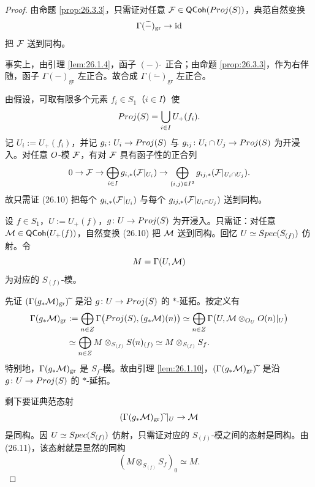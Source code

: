 \begin{proof}
由命题 \ref{prop:26.3.3}，只需证对任意 $\mathcal{F} \in \mathsf{QCoh}(Proj(S))$，典范自然变换
\begin{equation}\label{eq:26.10}
\Gamma(\widetilde{-})_{\mathrm{gr}} \to \operatorname{id}
\end{equation}
把 $\mathcal{F}$ 送到同构。

事实上，由引理 \ref{lem:26.1.4}，函子 $(-)\widetilde{\ }$ 正合；由命题 \ref{prop:26.3.3}，作为右伴随，函子 $\Gamma(-)_{\mathrm{gr}}$ 左正合。故合成 $\Gamma(\widetilde{-})_{\mathrm{gr}}$ 左正合。

由假设，可取有限多个元素 $f_i \in S_1$（$i \in I$）使
\[
Proj(S) = \bigcup_{i \in I} U_+(f_i).
\]
记 $U_i := U_+(f_i)$，并记 $g_i \colon U_i \to Proj(S)$ 与 $g_{ij} \colon U_i \cap U_j \to Proj(S)$ 为开浸入。对任意 $O$-模 $\mathcal{F}$，有对 $\mathcal{F}$ 具有函子性的正合列
\[
0 \to \mathcal{F} \to \bigoplus_{i \in I} g_{i,*}(\mathcal{F}|_{U_i}) \to \bigoplus_{(i,j) \in I^2} g_{ij,*}(\mathcal{F}|_{U_i \cap U_j}).
\]
故只需证 (26.10) 把每个 $g_{i,*}(\mathcal{F}|_{U_i})$ 与每个 $g_{ij,*}(\mathcal{F}|_{U_i \cap U_j})$ 送到同构。

设 $f \in S_1$，$U := U_+(f)$，$g \colon U \to Proj(S)$ 为开浸入。只需证：对任意 $\mathcal{M} \in \mathsf{QCoh}(U_+(f))$，自然变换 (26.10) 把 $\mathcal{M}$ 送到同构。回忆 $U \simeq Spec(S_{(f)})$ 仿射。令
\[
M = \Gamma(U, \mathcal{M})
\]
为对应的 $S_{(f)}$-模。

先证 $(\Gamma(g_*\cM)_{\mathrm{gr}})\widetilde{\ }$ 是沿 $g \colon U \to Proj(S)$ 的 $\ast$-延拓。按定义有
\begin{equation}\label{eq:26.11}
\begin{aligned}
\Gamma(g_*\mathcal{M})_{\mathrm{gr}} &:= \bigoplus_{n \in Z} \Gamma\bigl(Proj(S), (g_*\mathcal{M})(n)\bigr) \simeq \bigoplus_{n \in Z} \Gamma\bigl(U, \mathcal{M} \otimes_{O_U} O(n)|_U\bigr)\\
&\simeq \bigoplus_{n \in Z} M \otimes_{S_{(f)}} S(n)_{(f)} \simeq M \otimes_{S_{(f)}} S_f.
\end{aligned}
\end{equation}
特别地，$\Gamma(g_*\mathcal{M})_{\mathrm{gr}}$ 是 $S_f$-模。故由引理 \ref{lem:26.1.10}，$(\Gamma(g_*\cM)_{\mathrm{gr}})\widetilde{\ }$ 是沿 $g \colon U \to Proj(S)$ 的 $\ast$-延拓。

剩下要证典范态射
\[
(\Gamma(g_*\mathcal{M})_{\mathrm{gr}})\widetilde{\ }|_U \to \mathcal{M}
\]
是同构。因 $U \simeq Spec(S_{(f)})$ 仿射，只需证对应的 $S_{(f)}$-模之间的态射是同构。由 (26.11)，该态射就是显然的同构
\[
(M \otimes_{S_{(f)}} S_f)_0 \simeq M.
\]
\end{proof}


